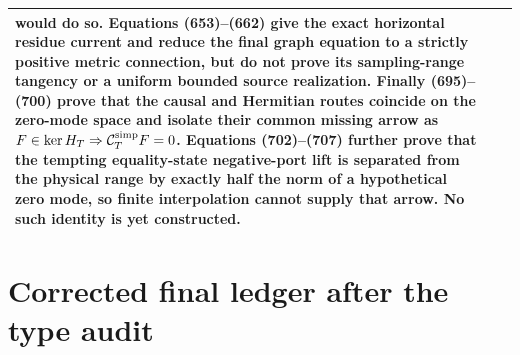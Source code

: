 \documentclass[11pt]{article}
\begin{document}
\begin{center}
\begin{tabular}{p{}p{}p{}}
      would do so.  Equations (653)--(662) give the exact horizontal residue
      current and reduce the final graph equation to a strictly positive
      metric connection, but do not prove its sampling-range tangency or a
      uniform bounded source realization.  Finally (695)--(700) prove that
      the causal and Hermitian routes coincide on the zero-mode space and
      isolate their common missing arrow as
      \(F\in\ker H_T\Rightarrow\mathcal C_T^{\rm simp}F=0\).
      Equations (702)--(707) further prove that the tempting equality-state
      negative-port lift is separated from the physical range by exactly
      half the norm of a hypothetical zero mode, so finite interpolation
      cannot supply that arrow.
      No such identity is yet constructed. \\
\hline
\end{tabular}
\end{center}

\section{Corrected final ledger after the type audit}
\end{document}
